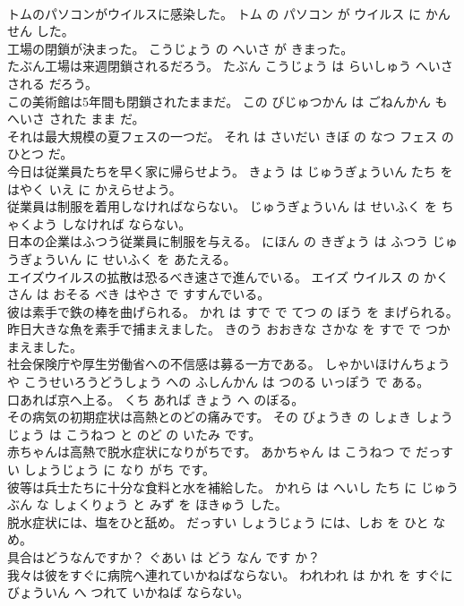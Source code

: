\documentclass[8pt]{extreport}
\begin{document}
\begin{CJK}{UTF8}{min}
\\	トムのパソコンがウイルスに感染した。	トム の パソコン が ウイルス に かんせん した。	
\\	工場の閉鎖が決まった。	こうじょう の へいさ が きまった。	
\\	たぶん工場は来週閉鎖されるだろう。	たぶん こうじょう は らいしゅう へいさ される だろう。	
\\	この美術館は5年間も閉鎖されたままだ。	この びじゅつかん は ごねんかん も へいさ された まま だ。	
\\	それは最大規模の夏フェスの一つだ。	それ は さいだい きぼ の なつ フェス の ひとつ だ。	
\\	今日は従業員たちを早く家に帰らせよう。	きょう は じゅうぎょういん たち を はやく いえ に かえらせよう。	
\\	従業員は制服を着用しなければならない。	じゅうぎょういん は せいふく を ちゃくよう しなければ ならない。	
\\	日本の企業はふつう従業員に制服を与える。	にほん の きぎょう は ふつう じゅうぎょういん に せいふく を あたえる。	
\\	エイズウイルスの拡散は恐るべき速さで進んでいる。	エイズ ウイルス の かくさん は おそる べき はやさ で すすんでいる。	
\\	彼は素手で鉄の棒を曲げられる。	かれ は すで で てつ の ぼう を まげられる。	
\\	昨日大きな魚を素手で捕まえました。	きのう おおきな さかな を すで で つかまえました。	
\\	社会保険庁や厚生労働省への不信感は募る一方である。	しゃかいほけんちょう や こうせいろうどうしょう への ふしんかん は つのる いっぽう で ある。	
\\	口あれば京へ上る。	くち あれば きょう へ のぼる。	
\\	その病気の初期症状は高熱とのどの痛みです。	その びょうき の しょき しょうじょう は こうねつ と のど の いたみ です。	
\\	赤ちゃんは高熱で脱水症状になりがちです。	あかちゃん は こうねつ で だっすい しょうじょう に なり がち です。	
\\	彼等は兵士たちに十分な食料と水を補給した。	かれら は へいし たち に じゅうぶん な しょくりょう と みず を ほきゅう した。	
\\	脱水症状には、塩をひと舐め。	だっすい しょうじょう には、しお を ひと なめ。	
\\	具合はどうなんですか？	ぐあい は どう なん です か？	
\\	我々は彼をすぐに病院へ連れていかねばならない。	われわれ は かれ を すぐに びょういん へ つれて いかねば ならない。	

\end{CJK}
\end{document}
